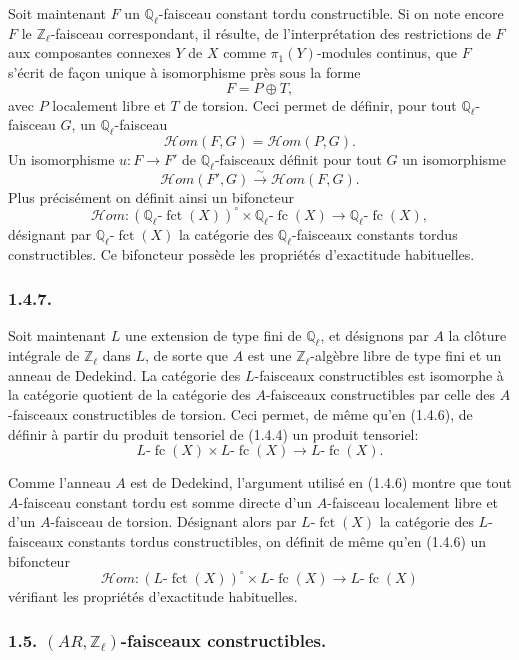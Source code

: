 \documentclass[11pt]{article}
\providecommand{\fct}{\operatorname{fct}}
\providecommand{\cHom}{\mathcal{H}om}
\providecommand{\fc}{\operatorname{fc}}
\begin{document}
Soit maintenant \(F\) un \(\mathbb Q_\ell\)-faisceau constant tordu constructible. Si on note encore \(F\) le \(\mathbb Z_\ell\)-faisceau correspondant, il résulte, de l'interprétation des restrictions de \(F\) aux composantes connexes \(Y\) de \(X\) comme \(\pi_1(Y)\)-modules continus, que \(F\) s'écrit de façon unique à isomorphisme près sous la forme
\[
F=P\oplus T,
\]
avec \(P\) localement libre et \(T\) de torsion. Ceci permet de définir, pour tout \(\mathbb Q_\ell\)-faisceau \(G\), un \(\mathbb Q_\ell\)-faisceau
\[
\cHom(F,G)=\cHom(P,G).
\]
Un isomorphisme \(u:F\to F'\) de \(\mathbb Q_\ell\)-faisceaux définit pour tout \(G\) un isomorphisme
\[
\cHom(F',G)\xrightarrow{\sim}\cHom(F,G).
\]
Plus précisément on définit ainsi un bifoncteur
\[
\cHom:(\mathbb Q_\ell\text{-}\fct(X))^\circ\times \mathbb Q_\ell\text{-}\fc(X)
\longrightarrow \mathbb Q_\ell\text{-}\fc(X),
\]
désignant par \(\mathbb Q_\ell\text{-}\fct(X)\) la catégorie des \(\mathbb Q_\ell\)-faisceaux constants tordus constructibles. Ce bifoncteur possède les propriétés d'exactitude habituelles.

\subsubsection*{1.4.7.}
Soit maintenant \(L\) une extension de type fini de \(\mathbb Q_\ell\), et désignons par \(A\) la clôture intégrale de \(\mathbb Z_\ell\) dans \(L\), de sorte que \(A\) est une \(\mathbb Z_\ell\)-algèbre libre de type fini et un anneau de Dedekind. La catégorie des \(L\)-faisceaux constructibles est isomorphe à la catégorie quotient de la catégorie des \(A\)-faisceaux constructibles par celle des \(A\)-faisceaux constructibles de torsion. Ceci permet, de même qu'en (1.4.6), de définir à partir du produit tensoriel de (1.4.4) un produit tensoriel:
\[
L\text{-}\fc(X)\times L\text{-}\fc(X)\longrightarrow L\text{-}\fc(X).
\]

Comme l'anneau \(A\) est de Dedekind, l'argument utilisé en (1.4.6) montre que tout \(A\)-faisceau constant tordu est somme directe d'un \(A\)-faisceau localement libre et d'un \(A\)-faisceau de torsion. Désignant alors par \(L\text{-}\fct(X)\) la catégorie des \(L\)-faisceaux constants tordus constructibles, on définit de même qu'en (1.4.6) un bifoncteur
\[
\cHom:(L\text{-}\fct(X))^\circ\times L\text{-}\fc(X)
\longrightarrow L\text{-}\fc(X)
\]
vérifiant les propriétés d'exactitude habituelles.

\subsubsection*{1.5. \((AR,\mathbb Z_\ell)\)-faisceaux constructibles.}
\end{document}
